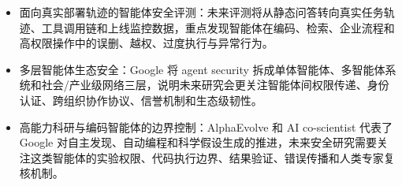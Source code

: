 \begin{longtblr}[
  caption = {北美主流AI智能体安全产品与落地方向},
  label   = {tab:north-america-agent-security-products},
]
\begin{itemize}[leftmargin=*,topsep=0pt,partopsep=0pt,itemsep=1pt,parsep=0pt]
    \item 面向真实部署轨迹的智能体安全评测：未来评测将从静态问答转向真实任务轨迹、工具调用链和上线监控数据，重点发现智能体在编码、检索、企业流程和高权限操作中的误删、越权、过度执行与异常行为。~\cite{googleaicontrolroadmap2026,deepmindagentsecurityblog2026,debenedetti2024agentdojo}

    \item 多层智能体生态安全：Google 将 agent security 拆成单体智能体、多智能体系统和社会/产业级网络三层，说明未来研究会更关注智能体间权限传递、身份认证、跨组织协作协议、信誉机制和生态级韧性。~\cite{googlethreelayersagentsecurity2026,habler2025securea2a}



    \item 高能力科研与编码智能体的边界控制：AlphaEvolve 和 AI co-scientist 代表了 Google 对自主发现、自动编程和科学假设生成的推进，未来安全研究需要关注这类智能体的实验权限、代码执行边界、结果验证、错误传播和人类专家复核机制。~\cite{deepmindalphaevolve2025,gottweis2025coscientist,googleaicontrolroadmap2026}


\end{itemize}
\end{longtblr}
